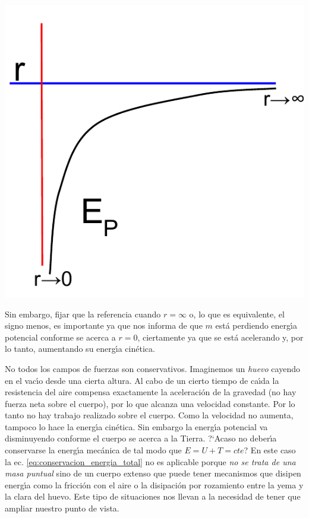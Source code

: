 \begin{marginfigure}
  \includegraphics[width=\linewidth]{EnergiaPotencial.pdf}
  \caption{Energ\'\i{}a potencial gravitatoria de una part\'\i{}cula en funci\'on de la distancia. La energ\'\i{}a vale $0$ cuando nos alejamos mucho de la masa que causa el campo gravitatorio. }
  \label{fig:energia_potencial_gravitatoria}
\end{marginfigure}

Sin embargo, fijar que la referencia cuando $r=\infty$ o, lo que es equivalente, el signo menos, es importante ya que nos informa de que $m$ est\'a perdiendo energ\'\i{}a potencial conforme se acerca a $r=0$, ciertamente ya que se est\'a acelerando y, por lo tanto, aumentando su energ\'\i{}a cin\'etica.

No todos los campos de fuerzas son conservativos. Imaginemos un \emph{huevo} cayendo en el vac\'\i{}o desde una cierta altura. Al cabo de un cierto tiempo de ca\'\i{}da la resistencia del aire compensa exactamente la aceleraci\'on de la gravedad (no hay fuerza neta sobre el cuerpo), por lo que alcanza una velocidad constante. Por lo tanto no hay trabajo realizado sobre el cuerpo. Como la velocidad no aumenta, tampoco lo hace la energ\'\i{}a cin\'etica. Sin embargo la energ\'\i{}a potencial va disminuyendo conforme el cuerpo se acerca a la Tierra. ?`Acaso no deber\'\i{}a conservarse la energ\'\i{}a mec\'anica de tal modo que $E=U+T=cte$? En este caso la ec. \ref{eq:conservacion_energia_total} no es aplicable porque \emph{no se trata de una masa puntual} sino de un cuerpo extenso que puede tener mecanismos que disipen energ\'\i{}a como la fricci\'on con el aire o la disipaci\'on por rozamiento entre la yema y la clara del huevo. Este tipo de situaciones nos llevan a la necesidad de tener que ampliar nuestro punto de vista.



